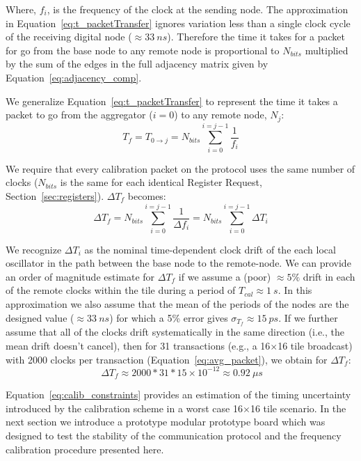 Where, $f_{i}$, is the frequency of the clock at the sending node. 
The approximation in Equation~\ref{eq:t_packetTransfer} ignores variation less than a single clock cycle of the receiving digital node ($\approx 33~\unit{ns}$).
Therefore the time it takes for a packet for go from the base node to any remote node is proportional to $N_{bits}$ multiplied by the sum of the edges in the full adjacency matrix given by Equation~\ref{eq:adjacency_comp}.

We generalize Equation~\ref{eq:t_packetTransfer} to represent the time it takes a packet to go from the aggregator ($i = 0$) to any remote node, $N_{j}$:
\begin{equation}
  T_{f} = T_{0\rightarrow j} = N_{bits}\sum_{i=0}^{i=j-1}\frac{1}{f_{i}}
\end{equation}

We require that every calibration packet on the protocol uses the same number of clocks ($N_{bits}$ is the same for each identical Register Request, Section~\ref{sec:registers}).
$\Delta T_{f}$ becomes:
\begin{equation}
  \Delta T_{f} = N_{bits}\sum_{i=0}^{i=j-1}\frac{1}{\Delta f_{i}} = N_{bits} \sum_{i=0}^{i=j-1}\Delta T_{i}
\end{equation}

We recognize $\Delta T_{i}$ as the nominal time-dependent clock drift of the each local oscillator in the path between the base node to the remote-node.
We can provide an order of magnitude estimate for $\Delta T_{f}$ if we assume a (poor) $\approx 5\%$ drift in each of the remote clocks within the tile during a period of $T_{cal} \approx 1~\unit{s}$.
In this approximation we also assume that the mean of the periods of the nodes are the designed value ($\approx 33~\unit{ns}$) for which a 5\% error gives $\sigma_{T_{f}} \approx 15~\unit{ps}$.
If we further assume that all of the clocks drift systematically in the same direction (i.e., the mean drift doesn't cancel), then for 31 transactions (e.g., a 16$\times$16 tile broadcast) with 2000 clocks per transaction (Equation~\ref{eq:avg_packet}), we obtain for $\Delta T_{f}$:
\begin{equation}~\label{eq:calib_constraints}
  \Delta T_{f} \approx 2000 * 31 * 15\times 10^{-12} \approx 0.92~\unit{\mu s} 
\end{equation}

Equation~\ref{eq:calib_constraints} provides an estimation of the timing uncertainty introduced by the calibration scheme in a worst case 16$\times$16 tile scenario.
In the next section we introduce a prototype modular prototype board which was designed to test the stability of the communication protocol and the frequency calibration procedure presented here.

